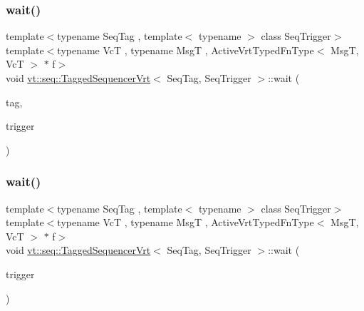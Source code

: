 \subsubsection{\texorpdfstring{wait()}{wait()}\hspace{0.1cm}{\footnotesize\ttfamily [1/2]}}
{\footnotesize\ttfamily template$<$typename Seq\+Tag , template$<$ typename $>$ class Seq\+Trigger$>$ \\
template$<$typename VcT , typename MsgT , Active\+Vrt\+Typed\+Fn\+Type$<$ Msg\+T, Vc\+T $>$ $\ast$ f$>$ \\
void \hyperlink{structvt_1_1seq_1_1_tagged_sequencer_vrt}{vt\+::seq\+::\+Tagged\+Sequencer\+Vrt}$<$ Seq\+Tag, Seq\+Trigger $>$\+::wait (\begin{DoxyParamCaption}\item[{\hyperlink{namespacevt_a84ab281dae04a52a4b243d6bf62d0e52}{Tag\+Type} const \&}]{tag,  }\item[{\hyperlink{structvt_1_1seq_1_1_tagged_sequencer_a4b015f2f7d3197a66af5576f0e63a834}{Seq\+Trigger\+Type}$<$ MsgT, VcT $>$}]{trigger }\end{DoxyParamCaption})}

\mbox{\label{structvt_1_1seq_1_1_tagged_sequencer_vrt_a88706e19289453ba99602e50dff901dd}} 
\subsubsection{\texorpdfstring{wait()}{wait()}\hspace{0.1cm}{\footnotesize\ttfamily [2/2]}}
{\footnotesize\ttfamily template$<$typename Seq\+Tag , template$<$ typename $>$ class Seq\+Trigger$>$ \\
template$<$typename VcT , typename MsgT , Active\+Vrt\+Typed\+Fn\+Type$<$ Msg\+T, Vc\+T $>$ $\ast$ f$>$ \\
void \hyperlink{structvt_1_1seq_1_1_tagged_sequencer_vrt}{vt\+::seq\+::\+Tagged\+Sequencer\+Vrt}$<$ Seq\+Tag, Seq\+Trigger $>$\+::wait (\begin{DoxyParamCaption}\item[{\hyperlink{structvt_1_1seq_1_1_tagged_sequencer_a4b015f2f7d3197a66af5576f0e63a834}{Seq\+Trigger\+Type}$<$ MsgT, VcT $>$}]{trigger }\end{DoxyParamCaption})}

